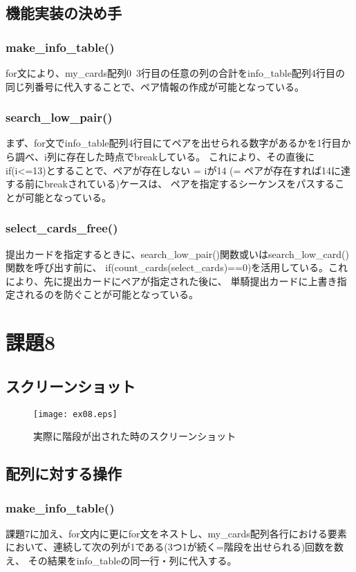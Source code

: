 \documentclass[11pt,a4paper, uplatex]{jsarticle}
\begin{document}
\subsection{機能実装の決め手}
\subsubsection{make_info_table()}
for文により、my_cards配列0~3行目の任意の列の合計をinfo_table配列4行目の同じ列番号に代入することで、ペア情報の作成が可能となっている。
\subsubsection{search_low_pair()}
まず、for文でinfo_table配列4行目にてペアを出せられる数字があるかを1行目から調べ、i列に存在した時点でbreakしている。
これにより、その直後にif(i<=13)とすることで、ペアが存在しない = iが14 (= ペアが存在すれば14に達する前にbreakされている)ケースは、
ペアを指定するシーケンスをパスすることが可能となっている。

\subsubsection{select_cards_free()}
提出カードを指定するときに、search_low_pair()関数或いはsearch_low_card()関数を呼び出す前に、
if(count_cards(select_cards)==0)を活用している。これにより、先に提出カードにペアが指定された後に、
単騎提出カードに上書き指定されるのを防ぐことが可能となっている。
\section{課題8}
\subsection{スクリーンショット}
\begin{figure}[h]
  \centering
  \caption{実際に階段が出された時のスクリーンショット}
  \texttt{[image: ex08.eps]}
\end{figure}
\subsection{配列に対する操作}
\subsubsection{make_info_table()}
課題7に加え、for文内に更にfor文をネストし、my_cards配列各行における要素において、連続して次の列が1である(3つ1が続く=階段を出せられる)回数を数え、
その結果をinfo_tableの同一行・列に代入する。
\end{document}
